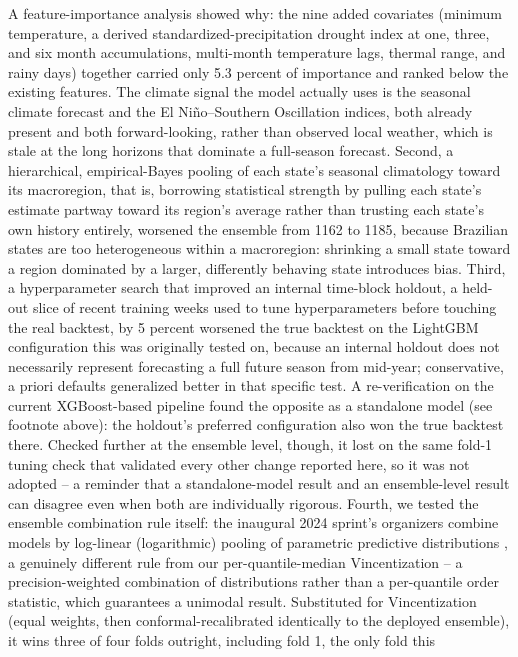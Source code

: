 \documentclass[11pt]{article}
\begin{document}
A feature-importance
analysis showed why: the nine
added covariates (minimum temperature, a derived standardized-precipitation drought index at one,
three, and six month accumulations, multi-month temperature lags, thermal range, and rainy days)
together carried only 5.3 percent of importance and ranked below the existing features. The climate
signal the model actually uses is the seasonal climate forecast and the El Ni\~no--Southern
Oscillation indices, both already present and both forward-looking, rather than observed local
weather, which is stale at the long horizons that dominate a full-season forecast. Second, a
hierarchical, empirical-Bayes pooling of each state's seasonal climatology toward its macroregion,
that is, borrowing statistical strength by pulling each state's estimate partway toward its
region's average rather than trusting each state's own history entirely,
worsened the ensemble from 1162 to 1185, because Brazilian states are too heterogeneous within a
macroregion: shrinking a small state toward a region dominated by a larger, differently behaving
state introduces bias. Third, a hyperparameter search that improved an internal time-block holdout,
a held-out slice of recent training weeks used to tune hyperparameters before touching the real
backtest,
by 5 percent worsened the true backtest on the LightGBM configuration this was originally tested
on, because an internal holdout does not necessarily represent forecasting a full future season
from mid-year; conservative, a priori defaults generalized better in that specific test. A
re-verification on the current XGBoost-based pipeline found the opposite as a standalone model (see
footnote above): the holdout's preferred configuration also won the true backtest there. Checked
further at the ensemble level, though, it lost on the same fold-1 tuning check that validated every
other change reported here, so it was not adopted -- a reminder that a standalone-model result and
an ensemble-level result can disagree even when both are individually rigorous. Fourth, we tested the ensemble combination
rule itself: the inaugural 2024 sprint's organizers combine models by log-linear (logarithmic)
pooling of parametric predictive distributions \citep{araujo2026,carvalho2023}, a genuinely
different rule from our per-quantile-median Vincentization -- a precision-weighted combination of
distributions rather than a per-quantile order statistic, which guarantees a unimodal result.
Substituted for Vincentization (equal weights, then conformal-recalibrated identically to the
deployed ensemble), it wins three of four folds outright, including fold 1, the only fold this
\end{document}
